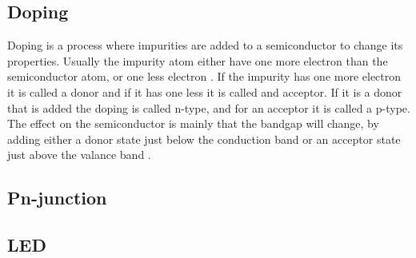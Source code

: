 \subsection{Doping}
Doping is a process where impurities are added to a semiconductor to change its properties. Usually the impurity atom either have one more electron than the semiconductor atom, or one less electron \cite{hofmann2015}. If the impurity has one more electron it is called a donor and if it has one less it is called and acceptor. If it is a donor that is added the doping is called n-type, and for an acceptor it is called a p-type. The effect on the semiconductor is mainly that the bandgap will change, by adding either a donor state just below the conduction band or an acceptor state just above the valance band \cite{hofmann2015}.

\subsection{Pn-junction}

\subsection{LED}